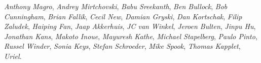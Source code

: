 \emph{Anthony Magro},
\emph{Andrey Mirtchovski},
\emph{Babu Sreekanth},
\emph{Ben Bullock},
\emph{Bob Cunningham},
\emph{Brian Fallik},
\emph{Cecil New},
\emph{Damian Gryski},
\emph{Dan Kortschak},
\emph{Filip Zaludek},
\emph{Haiping Fan},
\emph{Jaap Akkerhuis},
\emph{JC van Winkel},
\emph{Jeroen Bulten},
\emph{Jinpu Hu},
\emph{Jonathan Kans},
\emph{Makoto Inoue},
\emph{Mayuresh Kathe},
\emph{Michael Stapelberg},
\emph{Paulo Pinto},
\emph{Russel Winder},
\emph{Sonia Keys},
\emph{Stefan Schroeder},
\emph{Mike Spook},
\emph{Thomas Kapplet},
\emph{Uriel}.
